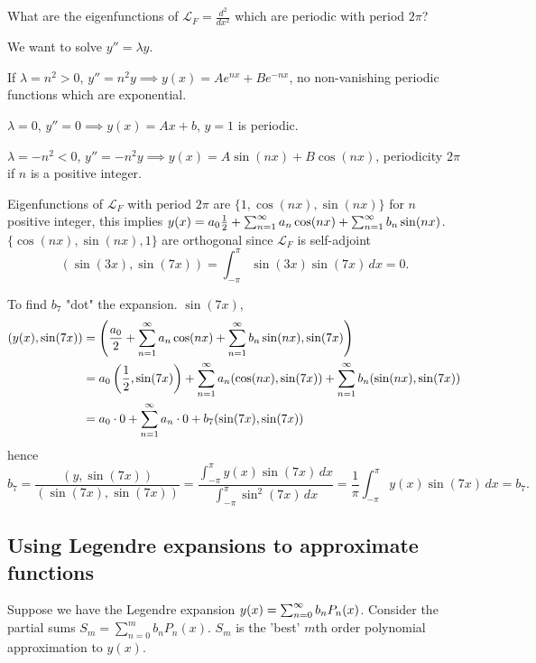 \documentclass[10pt, a4paper]{article}
\begin{document}
What are the eigenfunctions of $\mathcal{L}_F = \frac{d ^ 2}{dx ^ 2}$ which are periodic with period $2\pi$?

We want to solve $y'' = \lambda y$.

If $\lambda = n ^ 2 > 0$,
$y'' = n ^ 2y \implies y(x) = Ae ^ {nx} + Be ^ {-nx}$,
no non-vanishing periodic functions which are exponential.

$\lambda = 0$,
$y'' = 0 \implies y(x) = Ax + b$,
$y = 1$ is periodic.

$\lambda = -n ^ 2 < 0$,
$y'' = -n ^ 2y \implies y(x) = A\sin(nx) + B\cos(nx)$,
periodicity $2\pi$ if $n$ is a positive integer.

Eigenfunctions of $\mathcal{L}_F$ with period $2\pi$ are $\{1, \cos(nx), \sin(nx)\}$ for $n$ positive integer,
this implies $y(x) = a_0\frac{1}{2} + \infsum[n = 1]a_n\cos(nx) + \infsum[n = 1]b_n\sin(nx)$.
$\{\cos(nx), \sin(nx), 1\}$ are orthogonal since $\mathcal{L}_F$ is self-adjoint
\[
(\sin(3x), \sin(7x)) = \int_{-\pi}^{\pi}\sin(3x)\sin(7x)\,dx = 0.
\]

To find $b_7$ "dot" the expansion.
$\sin(7x)$,
\begin{align*}
    (y(x), \sin(7x)) &= \left(\frac{a_0}{2} + \infsum[n = 1]a_n\cos(nx) + \infsum[n = 1]b_n\sin(nx), \sin(7x)\right) \\
    &= a_0\left(\frac{1}{2}, \sin(7x)\right) + \infsum[n = 1]a_n(\cos(nx), \sin(7x)) + \infsum[n = 1]b_n(\sin(nx), \sin(7x)) \\
    &= a_0 \cdot 0 + \infsum[n = 1]a_n\cdot 0 + b_7(\sin(7x), \sin(7x))
\end{align*}
hence
\[
b_7 = \frac{(y, \sin(7x))}{(\sin(7x), \sin(7x))} = \frac{\int_{-\pi}^{\pi}y(x)\sin(7x)\,dx}{\int_{-\pi}^{\pi}\sin ^ 2(7x)\,dx} = \frac{1}{\pi}\int_{-\pi}^{\pi}y(x)\sin(7x)\,dx = b_7.
\]

\subsection{Using Legendre expansions to approximate functions}
Suppose we have the Legendre expansion $y(x) = \infsum[n = 0]b_nP_n(x)$.
Consider the partial sums $S_m = \sum_{n = 0}^{m}b_nP_n(x)$.
$S_m$ is the 'best' $m$th order polynomial approximation to $y(x)$.
\end{document}
